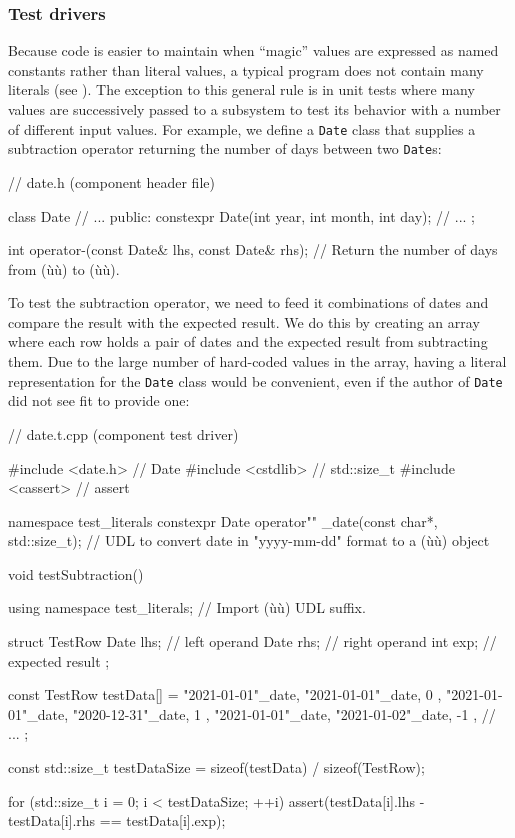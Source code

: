 \subsubsection[Test drivers]{Test drivers}\label{test-drivers}

Because code is easier to maintain when ``magic'' values are expressed
as named constants rather than literal values, a typical program does
not contain many literals (see ). The
exception to this general rule is in unit tests where many values are
successively passed to a subsystem to test its behavior with a number of
different input values. For example, we define a \lstinline!Date! class
that supplies a subtraction operator returning the number of days
between two \lstinline!Date!s:

\begin{emcppslisting}
// date.h (component header file)

class Date
{
    // ...
public:
    constexpr Date(int year, int month, int day);
    // ...
};

int operator-(const Date& lhs, const Date& rhs);
    // Return the number of days from (ù{}ù) to (ù{}ù).
\end{emcppslisting}
    
\noindent To test the subtraction operator, we need to feed it combinations of
dates and compare the result with the expected result. We do this by
creating an array where each row holds a pair of dates and the expected
result from subtracting them. Due to the large number of hard-coded
values in the array, having a literal representation for the
\lstinline!Date! class would be convenient, even if the author of
\lstinline!Date! did not see fit to provide one:

\begin{emcppslisting}
// date.t.cpp (component test driver)

#include <date.h>   // Date
#include <cstdlib>  // std::size_t
#include <cassert>  // assert

namespace test_literals
{
    constexpr Date operator"" _date(const char*, std::size_t);
        // UDL to convert date in "yyyy-mm-dd" format to a (ù{}ù) object
}

void testSubtraction()
{
    using namespace test_literals;  // Import (ù{}ù) UDL suffix.

    struct TestRow
    {
        Date lhs;  // left operand
        Date rhs;  // right operand
        int  exp;  // expected result
    };

    const TestRow testData[] =
    {
        { "2021-01-01"_date, "2021-01-01"_date,  0 },
        { "2021-01-01"_date, "2020-12-31"_date,  1 },
        { "2021-01-01"_date, "2021-01-02"_date, -1 },
        // ...
    };

    const std::size_t testDataSize = sizeof(testData) / sizeof(TestRow);

    for (std::size_t i = 0; i < testDataSize; ++i)
    {
        assert(testData[i].lhs - testData[i].rhs == testData[i].exp);
    }
}
\end{emcppslisting}
    

